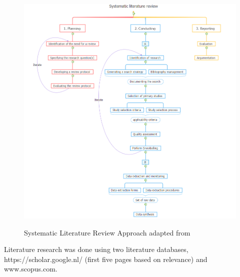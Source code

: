 \begin{figure}[htbp!]
  \caption{Systematic Literature Review Approach adapted from \citet{Kitchenham2007GuidelinesEngineering,Levy2006AResearch}}
  \centering
  \includegraphics[width=1.0\textwidth]{Images/Decision/Systematic literature review modified.PNG}
   \label{fig:slr}
\end{figure}

Literature research was done using two literature databases, https://scholar.google.nl/ (first five pages based on relevance) and www.scopus.com.

